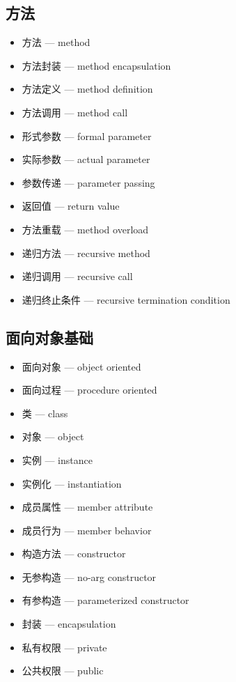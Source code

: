 \subsection{方法}
\begin{itemize}
\item 方法 — method
\item 方法封装 — method encapsulation
\item 方法定义 — method definition
\item 方法调用 — method call
\item 形式参数 — formal parameter
\item 实际参数 — actual parameter
\item 参数传递 — parameter passing
\item 返回值 — return value
\item 方法重载 — method overload
\item 递归方法 — recursive method
\item 递归调用 — recursive call
\item 递归终止条件 — recursive termination condition
\end{itemize}

\subsection{面向对象基础}
\begin{itemize}
\item 面向对象 — object oriented
\item 面向过程 — procedure oriented
\item 类 — class
\item 对象 — object
\item 实例 — instance
\item 实例化 — instantiation
\item 成员属性 — member attribute
\item 成员行为 — member behavior
\item 构造方法 — constructor
\item 无参构造 — no-arg constructor
\item 有参构造 — parameterized constructor
\item 封装 — encapsulation
\item 私有权限 — private
\item 公共权限 — public
\end{itemize}

